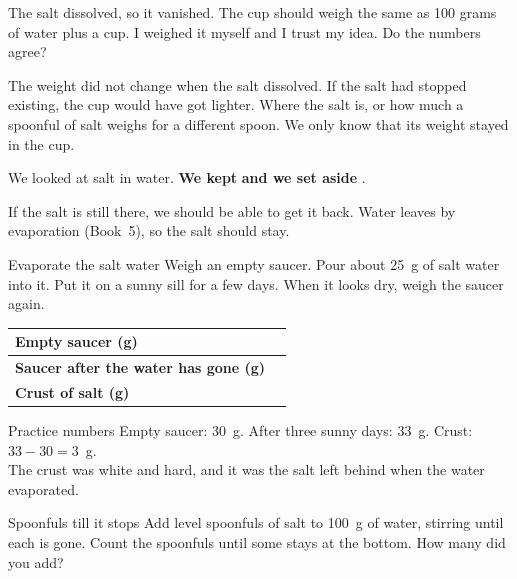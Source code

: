 \begin{multix}[hmm]\multixbot[hmm]\tcblower
The salt dissolved, so it vanished. The cup should weigh the same as 100 grams of water plus a cup. I weighed it myself and I trust my idea. Do the numbers agree?
\end{multix}

{The weight did not change when the salt dissolved. If the salt had stopped existing, the cup would have got lighter.}
{Where the salt is, or how much a spoonful of salt weighs for a different spoon. We only know that its weight stayed in the cup.}

\begin{keepbox}
We looked at salt in water. \textbf{We kept} \wline[3.4cm] \textbf{and we set aside} \wline[3.4cm].
\end{keepbox}

\clearpage

If the salt is still there, we should be able to get it back. Water leaves by evaporation (Book~5), so the salt should stay.

\begin{tryit}{Evaporate the salt water}
Weigh an empty saucer. Pour about 25~g of salt water into it. Put it on a sunny sill for a few days. When it looks dry, weigh the saucer again.\par\medskip
\renewcommand{\arraystretch}{1.6}
\begin{tabular}{|l|c|}
\hline
\textbf{Empty saucer (g)} & \\ \hline
\textbf{Saucer after the water has gone (g)} & \\ \hline
\textbf{Crust of salt (g)} & \\ \hline
\end{tabular}
\end{tryit}

\begin{worked}{Practice numbers}
Empty saucer: 30~g. After three sunny days: 33~g. Crust: $33-30=3$~g.\\
The crust was white and hard, and it was the salt left behind when the water evaporated.
\end{worked}

\begin{tryit}{Spoonfuls till it stops}
Add level spoonfuls of salt to 100~g of water, stirring until each is gone. Count the spoonfuls until some stays at the bottom. How many did you add? \wline[2cm]
\end{tryit}

